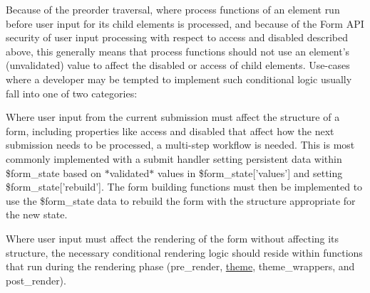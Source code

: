 Because of the preorder traversal, where process functions of an element run before user input for its child elements is processed, and because of the Form API security of user input processing with respect to access and disabled described above, this generally means that process functions should not use an element's (unvalidated) value to affect the disabled or access of child elements. Use-\/cases where a developer may be tempted to implement such conditional logic usually fall into one of two categories:
\begin{DoxyItemize}
\item Where user input from the current submission must affect the structure of a form, including properties like access and disabled that affect how the next submission needs to be processed, a multi-\/step workflow is needed. This is most commonly implemented with a submit handler setting persistent data within \$form\_\-state based on $\ast$validated$\ast$ values in \$form\_\-state\mbox{[}'values'\mbox{]} and setting \$form\_\-state\mbox{[}'rebuild'\mbox{]}. The form building functions must then be implemented to use the \$form\_\-state data to rebuild the form with the structure appropriate for the new state.
\item Where user input must affect the rendering of the form without affecting its structure, the necessary conditional rendering logic should reside within functions that run during the rendering phase (pre\_\-render, \hyperlink{includes_2theme_8inc_a7c25609a935874541a19657affd30fff}{theme}, theme\_\-wrappers, and post\_\-render).
\end{DoxyItemize}


